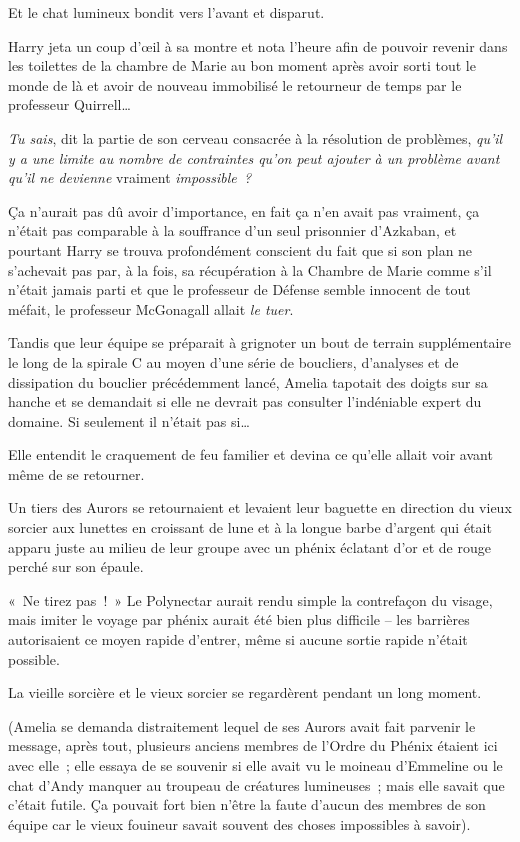 Et le chat lumineux bondit vers l'avant et disparut.

Harry jeta un coup d'œil à sa montre et nota l'heure afin de pouvoir revenir dans les toilettes de la chambre de Marie au bon moment après avoir sorti tout le monde de là et avoir de nouveau immobilisé le retourneur de temps par le professeur Quirrell…

\emph{Tu sais}, dit la partie de son cerveau consacrée à la résolution de problèmes, \emph{qu'il y a une limite au nombre de contraintes qu'on peut ajouter à un problème avant qu'il ne devienne} vraiment \emph{impossible~?}

Ça n'aurait pas dû avoir d'importance, en fait ça n'en avait pas vraiment, ça n'était pas comparable à la souffrance d'un seul prisonnier d'Azkaban, et pourtant Harry se trouva profondément conscient du fait que si son plan ne s'achevait pas par, à la fois, sa récupération à la Chambre de Marie comme s'il n'était jamais parti et que le professeur de Défense semble innocent de tout méfait, le professeur McGonagall allait \emph{le tuer}.

\later

Tandis que leur équipe se préparait à grignoter un bout de terrain supplémentaire le long de la spirale C au moyen d'une série de boucliers, d'analyses et de dissipation du bouclier précédemment lancé, Amelia tapotait des doigts sur sa hanche et se demandait si elle ne devrait pas consulter l'indéniable expert du domaine.
Si seulement il n'était pas si…

Elle entendit le craquement de feu familier et devina ce qu'elle allait voir avant même de se retourner.

Un tiers des Aurors se retournaient et levaient leur baguette en direction du vieux sorcier aux lunettes en croissant de lune et à la longue barbe d'argent qui était apparu juste au milieu de leur groupe avec un phénix éclatant d'or et de rouge perché sur son épaule.

«~Ne tirez pas~!~»
Le Polynectar aurait rendu simple la contrefaçon du visage, mais imiter le voyage par phénix aurait été bien plus difficile -- les barrières autorisaient ce moyen rapide d'entrer, même si aucune sortie rapide n'était possible.

La vieille sorcière et le vieux sorcier se regardèrent pendant un long moment.

(Amelia se demanda distraitement lequel de ses Aurors avait fait parvenir le message, après tout, plusieurs anciens membres de l'Ordre du Phénix étaient ici avec elle~; elle essaya de se souvenir si elle avait vu le moineau d'Emmeline ou le chat d'Andy manquer au troupeau de créatures lumineuses~; mais elle savait que c'était futile.
Ça pouvait fort bien n'être la faute d'aucun des membres de son équipe car le vieux fouineur savait souvent des choses impossibles à savoir).

